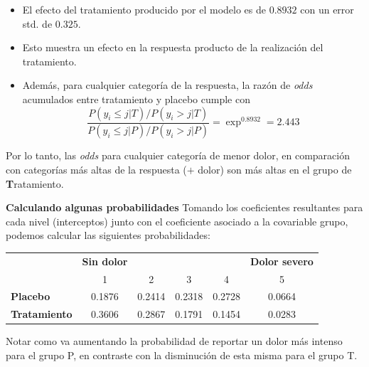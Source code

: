 \documentclass[]{beamer}
\begin{document}
\begin{frame}
	\begin{itemize}
		\item El efecto del tratamiento producido por el modelo es de $0.8932$ con un error std. de $0.325$. 
		\item Esto muestra un efecto en la respuesta producto de la realización del tratamiento.
		\item Además, para cualquier categoría de la respuesta, la razón de \textit{odds} acumulados entre tratamiento y placebo cumple con $$\frac{P(y_i\leq j|T)/P(y_i> j|T)}{P(y_i\leq j|P)/P(y_i> j|P)}=\exp^{0.8932}=2.443$$
	\end{itemize}

Por lo tanto, las \textit{odds} para cualquier categoría de menor dolor, en comparación con categorías más altas de la respuesta ($+$ dolor) son más altas en el grupo de \textbf{T}ratamiento.
\end{frame}

\begin{frame}
	\textbf{Calculando algunas probabilidades}
	Tomando los coeficientes resultantes para cada nivel (interceptos) junto con el coeficiente asociado a la covariable grupo, podemos calcular las siguientes probabilidades:
	
	\begin{table}[]
\begin{tabular}{lccccc}
                & \textbf{Sin dolor} &    &    &    & \textbf{Dolor severo} \\
                     & 1                  & 2  & 3  & 4  & 5                     \\ \hline
\textbf{Placebo}     & 0.1876                 & 0.2414  & 0.2318 & 0.2728 & 0.0664                     \\
\textbf{Tratamiento} & 0.3606                 & 0.2867 & 0.1791 & 0.1454  & 0.0283                     \\ \hline
\end{tabular}
\end{table}
	
	Notar como va aumentando la probabilidad de reportar un dolor más intenso para el grupo P, en contraste con la disminución de esta misma para el grupo T.
\end{frame}
\end{document}
